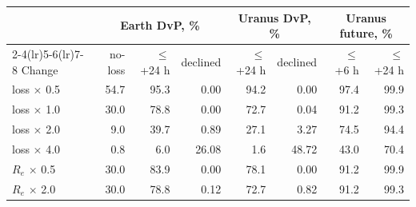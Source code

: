 \par\noindent
\begin{tabular}{lrrrrrrr}
\toprule
 & \multicolumn{3}{c}{Earth DvP, \%} & \multicolumn{2}{c}{Uranus DvP, \%} & \multicolumn{2}{c}{Uranus future, \%} \\
\cmidrule(lr){2-4}\cmidrule(lr){5-6}\cmidrule(lr){7-8}
Change & no-loss & $\le$ +24 h & declined & $\le$ +24 h & declined & $\le$ +6 h & $\le$ +24 h\\
\midrule
loss $\times$ 0.5 & 54.7 & 95.3 & 0.00 & 94.2 & 0.00 & 97.4 & 99.9\\
loss $\times$ 1.0 & 30.0 & 78.8 & 0.00 & 72.7 & 0.04 & 91.2 & 99.3\\
loss $\times$ 2.0 & 9.0 & 39.7 & 0.89 & 27.1 & 3.27 & 74.5 & 94.4\\
loss $\times$ 4.0 & 0.8 & 6.0 & 26.08 & 1.6 & 48.72 & 43.0 & 70.4\\
$R_e$ $\times$ 0.5 & 30.0 & 83.9 & 0.00 & 78.1 & 0.00 & 91.2 & 99.9\\
$R_e$ $\times$ 2.0 & 30.0 & 78.8 & 0.12 & 72.7 & 0.82 & 91.2 & 99.3\\
\bottomrule
\end{tabular}\par
